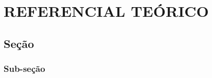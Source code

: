 \section{REFERENCIAL TEÓRICO}

\lipsum[1-2]

\subsection{Seção}

\lipsum[1-3]

\subsubsection{Sub-seção}

\lipsum [1-2]


\lipsum[1-2]